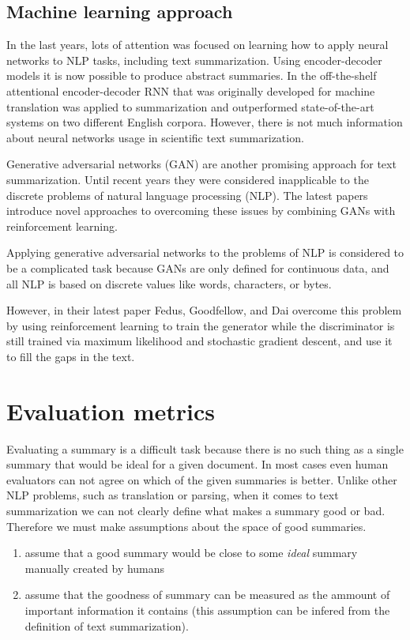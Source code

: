\documentclass[sigplan]{acmart}
\begin{document}
\subsection{Machine learning approach}

In the last years, lots of attention was focused on learning how to apply neural networks to NLP tasks, including text summarization. Using encoder-decoder models it is now possible to produce abstract summaries. In \cite{nallapati-16} the off-the-shelf attentional encoder-decoder RNN that was originally developed for machine translation was applied to summarization and outperformed state-of-the-art systems on two different English corpora. However, there is not much information about neural networks usage in scientific text summarization.

Generative adversarial networks (GAN) are another promising approach for text summarization. Until recent years they were considered inapplicable to the discrete problems of natural language processing (NLP). The latest papers introduce novel approaches to overcoming these issues by combining GANs with reinforcement learning.

Applying generative adversarial networks to the problems of NLP is considered to be a complicated task because GANs are only defined for continuous data, and all NLP is based on discrete values like words, characters, or bytes.

However, in their latest paper Fedus, Goodfellow, and Dai\cite{fedus-18} overcome this problem by using reinforcement learning to train the generator while the discriminator is still trained via maximum likelihood and stochastic gradient descent, and use it to fill the gaps in the text.


\section{Evaluation metrics}
\label{sec:evaluation}

Evaluating a summary is a difficult task because there is no such thing as a single summary that would be ideal for a given document. In most cases even human evaluators can not agree on which of the given summaries is better\cite{das-7}. Unlike other NLP problems, such as translation or parsing, when it comes to text summarization we can not clearly define what makes a summary good or bad. Therefore we must make assumptions about the space of good summaries. 

\begin{enumerate}
\item assume that a good summary would be close to some \textit{ideal} summary manually created by humans
\item assume that the goodness of summary can be measured as the ammount of important information it contains (this assumption can be infered from the definition of text summarization).
\end{enumerate}
\end{document}

